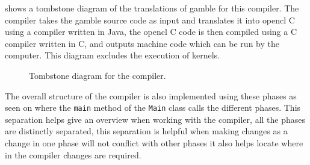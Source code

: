  shows a tombstone diagram of the translations of \gls{gamble} for this compiler.
The compiler takes the \gls{gamble} source code as input and translates it into \gls{opencl} C using a compiler written in Java, the \gls{opencl} C code is then compiled using a C compiler written in C, and outputs machine code which can be run by the computer. 
This diagram excludes the execution of kernels.
\begin{figure}[!ht]
\centering
{}
\caption{Tombstone diagram for the compiler.}
\label{fig:tombstone}
\end{figure}


The overall structure of the compiler is also implemented using these phases as seen on  where the \texttt{main} method of the \texttt{Main} class calls the different phases.
This separation helps give an overview when working with the compiler, all the phases are distinctly separated, this separation is helpful when making changes as a change in one phase will not conflict with other phases it also helps locate where in the compiler changes are required.

